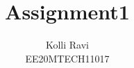 \documentclass[journal,12pt,twocolumn]{IEEEtran}
\begin{document}
	\makeatletter
	\makeatother
	\let\StandardTheFigure\thefigure
	\let\vec\mathbf
	\renewcommand{\thefigure}{\theproblem}
	\def\putbox#1#2#3{\makebox[0in][l]{\makebox[#1][l]{}\raisebox{\baselineskip}[0in][0in]{\raisebox{#2}[0in][0in]{#3}}}}
	\def\rightbox#1{\makebox[0in][r]{#1}}
	\def\centbox#1{\makebox[0in]{#1}}
	\def\topbox#1{\raisebox{-\baselineskip}[0in][0in]{#1}}
	\def\midbox#1{\raisebox{-0.5\baselineskip}[0in][0in]{#1}}
	\vspace{3cm}
	\title{Assignment1}
	\author{Kolli Ravi\\EE20MTECH11017}
\end{document}
